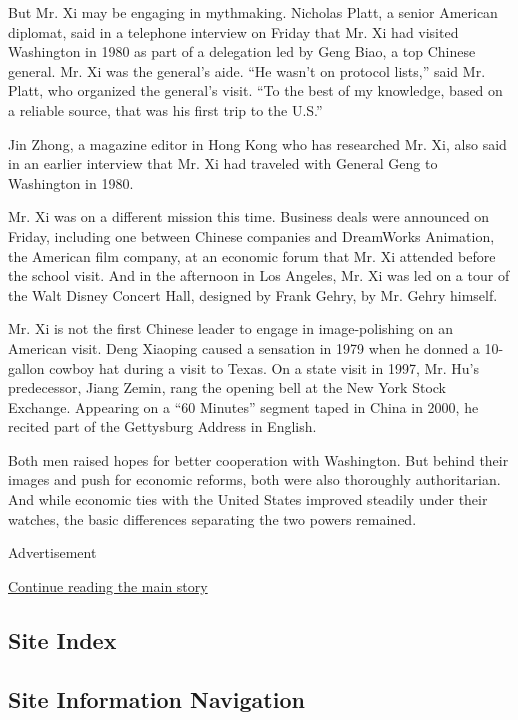 But Mr. Xi may be engaging in mythmaking. Nicholas Platt, a senior
American diplomat, said in a telephone interview on Friday that Mr. Xi
had visited Washington in 1980 as part of a delegation led by Geng Biao,
a top Chinese general. Mr. Xi was the general's aide. ``He wasn't on
protocol lists,'' said Mr. Platt, who organized the general's visit.
``To the best of my knowledge, based on a reliable source, that was his
first trip to the U.S.''

Jin Zhong, a magazine editor in Hong Kong who has researched Mr. Xi,
also said in an earlier interview that Mr. Xi had traveled with General
Geng to Washington in 1980.

Mr. Xi was on a different mission this time. Business deals were
announced on Friday, including one between Chinese companies and
DreamWorks Animation, the American film company, at an economic forum
that Mr. Xi attended before the school visit. And in the afternoon in
Los Angeles, Mr. Xi was led on a tour of the Walt Disney Concert Hall,
designed by Frank Gehry, by Mr. Gehry himself.

Mr. Xi is not the first Chinese leader to engage in image-polishing on
an American visit. Deng Xiaoping caused a sensation in 1979 when he
donned a 10-gallon cowboy hat during a visit to Texas. On a state visit
in 1997, Mr. Hu's predecessor, Jiang Zemin, rang the opening bell at the
New York Stock Exchange. Appearing on a ``60 Minutes'' segment taped in
China in 2000, he recited part of the Gettysburg Address in English.

Both men raised hopes for better cooperation with Washington. But behind
their images and push for economic reforms, both were also thoroughly
authoritarian. And while economic ties with the United States improved
steadily under their watches, the basic differences separating the two
powers remained.

Advertisement

\protect\hyperlink{after-bottom}{Continue reading the main story}

\hypertarget{site-index}{%
\subsection{Site Index}\label{site-index}}

\hypertarget{site-information-navigation}{%
\subsection{Site Information
Navigation}\label{site-information-navigation}}

